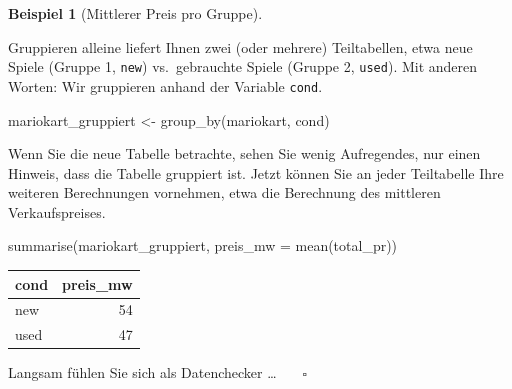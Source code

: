 \documentclass[
  a4paper,
  DIV=11]{scrreprt}
\newenvironment{Shaded}{\begin{snugshade}}{\end{snugshade}}
\newcommand{\AttributeTok}[1]{\textcolor[rgb]{0.40,0.45,0.13}{#1}}
\newcommand{\FunctionTok}[1]{\textcolor[rgb]{0.28,0.35,0.67}{#1}}
\newcommand{\NormalTok}[1]{\textcolor[rgb]{0.00,0.23,0.31}{#1}}
\newcommand{\OtherTok}[1]{\textcolor[rgb]{0.00,0.23,0.31}{#1}}
\theoremstyle{definition}
\theoremstyle{definition}
\newtheorem{example}{Beispiel}[chapter]
\theoremstyle{definition}
\theoremstyle{remark}
\begin{document}
\begin{example}[Mittlerer Preis pro
Gruppe]\protect\hypertarget{exm-groupby}{}\label{exm-groupby}

Gruppieren alleine liefert Ihnen zwei (oder mehrere) Teiltabellen, etwa
neue Spiele (Gruppe 1, \texttt{new}) vs.~gebrauchte Spiele (Gruppe 2,
\texttt{used}). Mit anderen Worten: Wir gruppieren anhand der Variable
\texttt{cond}.

\begin{Shaded}
\begin{Highlighting}[]
\NormalTok{mariokart\_gruppiert }\OtherTok{\textless{}{-}} \FunctionTok{group\_by}\NormalTok{(mariokart, cond)}
\end{Highlighting}
\end{Shaded}

Wenn Sie die neue Tabelle betrachte, sehen Sie wenig Aufregendes, nur
einen Hinweis, dass die Tabelle gruppiert ist. Jetzt können Sie an jeder
Teiltabelle Ihre weiteren Berechnungen vornehmen, etwa die Berechnung
des mittleren Verkaufspreises.

\begin{Shaded}
\begin{Highlighting}[]
\FunctionTok{summarise}\NormalTok{(mariokart\_gruppiert, }\AttributeTok{preis\_mw =} \FunctionTok{mean}\NormalTok{(total\_pr))}
\end{Highlighting}
\end{Shaded}

\begin{longtable}[]{@{}lr@{}}
\toprule\noalign{}
cond & preis\_mw \\
\midrule\noalign{}
\endhead
\bottomrule\noalign{}
\endlastfoot
new & 54 \\
used & 47 \\
\end{longtable}

Langsam fühlen Sie sich als Datenchecker \ldots{} 🥷 🦹‍♀ \(\square\)

\end{example}
\end{document}
